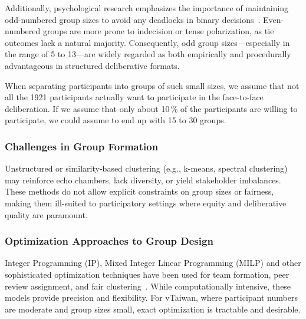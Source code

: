 Additionally, psychological research emphasizes the importance of maintaining odd-numbered group sizes
to avoid any deadlocks in binary decisions~\parencite{menon2011oddgroups}.
Even-numbered groups are more prone to indecision or tense polarization, as tie outcomes lack a natural majority.
Consequently, odd group sizes—especially in the range of 5 to 13—are widely regarded as both empirically
and procedurally advantageous in structured deliberative formats.

When separating participants into groups of such small sizes, we assume that not all the 1921 participants
actually want to participate in the face-to-face deliberation.
If we assume that only about 10\,\% of the participants are willing to participate,
we could assume to end up with 15 to 30 groups.

\subsubsection*{Challenges in Group Formation}

Unstructured or similarity-based clustering (e.g., k-means, spectral clustering) may reinforce echo chambers,
lack diversity, or yield stakeholder imbalances.
These methods do not allow explicit constraints on group sizes or fairness,
making them ill-suited to participatory settings where equity and deliberative quality are paramount.

\subsubsection*{Optimization Approaches to Group Design}

Integer Programming (IP), Mixed Integer Linear Programming (MILP) and other sophisticated optimization techniques
have been used for team formation, peer review assignment,
and fair clustering~\parencite{anagnostopoulos2012groupformation, celis2018fair, charlin2013toronto}.
While computationally intensive, these models provide precision and flexibility.
For vTaiwan, where participant numbers are moderate and group sizes small, exact optimization is tractable and desirable.
